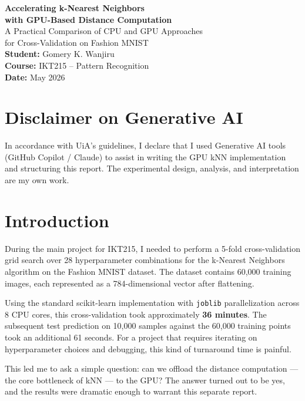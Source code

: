 \documentclass[11pt]{article}
\begin{document}
\begin{titlepage}
	\centering
	\vspace*{3cm}
	\Huge\textbf{Accelerating k-Nearest Neighbors \\ with GPU-Based Distance Computation} \\
	\vspace{1cm}
	\Large A Practical Comparison of CPU and GPU Approaches \\ for Cross-Validation on Fashion MNIST \\
	\vspace{2cm}
	\Large \textbf{Student:} Gomery K. Wanjiru \\
	\Large \textbf{Course:} IKT215 -- Pattern Recognition \\
	\Large \textbf{Date:} May 2026 \\
	\vfill
	\section*{Disclaimer on Generative AI}
	In accordance with UiA's guidelines, I declare that I used Generative AI tools (GitHub Copilot / Claude) to assist in writing the GPU kNN implementation and structuring this report. The experimental design, analysis, and interpretation are my own work.
\end{titlepage}

\newpage
\section{Introduction}

During the main project for IKT215, I needed to perform a 5-fold cross-validation grid search over 28 hyperparameter combinations for the k-Nearest Neighbors algorithm on the Fashion MNIST dataset. The dataset contains 60,000 training images, each represented as a 784-dimensional vector after flattening.

Using the standard scikit-learn implementation with \texttt{joblib} parallelization across 8 CPU cores, this cross-validation took approximately \textbf{36 minutes}. The subsequent test prediction on 10,000 samples against the 60,000 training points took an additional 61 seconds. For a project that requires iterating on hyperparameter choices and debugging, this kind of turnaround time is painful.

This led me to ask a simple question: can we offload the distance computation --- the core bottleneck of kNN --- to the GPU? The answer turned out to be yes, and the results were dramatic enough to warrant this separate report.
\end{document}
